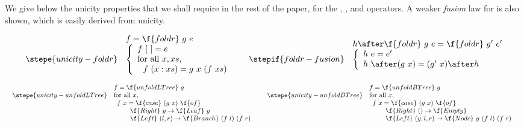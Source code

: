 \documentclass[a4paper,11pt]{llncs}
\begin{document}
We give below the unicity properties that we shall require in the rest
of the paper, for the , , and
 operators.  A weaker \emph{fusion} law for 
is also shown, which is easily derived from unicity.




$$
\begin{array}{ll}
\begin{array}{rl}
& f = \f{foldr}\ g\ e \\
\stepe{unicity-foldr}
& \left \{
\begin{array}{l}
f\ [\ ]  =  e\\
\mbox{for all } x, xs,\\
\ \ f\ (x:xs) = g\ x\ (f\ xs)
\end{array}
\right .
\end{array}
& 
\begin{array}{rl}
  &  h \after \f{foldr}\ g\ e = \f{foldr}\ g'\ e'\\
  \stepif{foldr-fusion}
  & \left \{ 
    \begin{array}{l}
h\ e = e'\\
h\ \after (g\ x) = (g'\ x) \after h
    \end{array}
  \right .
\end{array}
\end{array}
$$

$$
\begin{array}{ll}
\begin{array}{rl}
& f = \f{unfoldLTree}\ g \\
\stepe{unicity-unfoldLTree}
& \mbox{for all } x,\\
&\begin{array}{l}
f\ x  =  \f{case}\ (g\ x)\ \f{of}\\
\qquad \f{Right}\ y \to \f{Leaf}\ y\\
\qquad \f{Left}\ (l,r) \to \f{Branch}\ (f\ l)\ (f\ r)
\end{array}
\end{array}
&
\begin{array}{rl}
& f = \f{unfoldBTree}\ g \\
\stepe{unicity-unfoldBTree}
& \mbox{for all } x,\\
&\begin{array}{l}
f\ x  =  \f{case}\ (g\ x)\ \f{of}\\
\qquad \f{Right}\ () \to \f{Empty}\\
\qquad \f{Left}\ (y,l,r) \to \f{Node}\ y\ (f\ l)\ (f\ r)
\end{array}
\end{array}
\end{array}
$$
\end{document}
